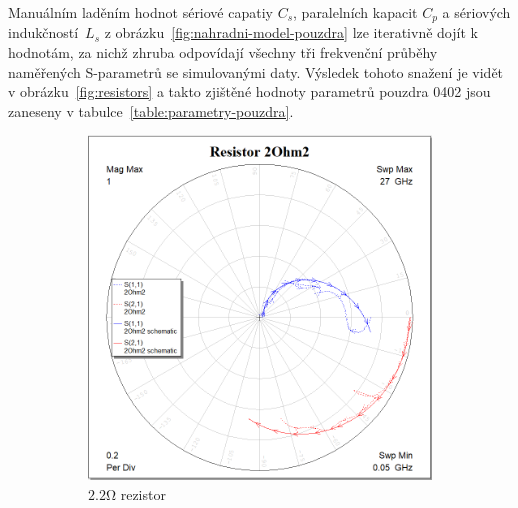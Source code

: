 \documentclass[11pt,a4paper]{article}
\newcommand{\Ohm}{\mathrm{\Omega}}
\begin{document}
Manuálním laděním hodnot sériové capatiy $C_s$, paralelních kapacit $C_p$ a sériových indukčností~$L_s$ z obrázku~\ref{fig:nahradni-model-pouzdra} lze iterativně dojít k hodnotám, za nichž zhruba odpovídají všechny tři frekvenční průběhy naměřených S-parametrů se simulovanými daty. Výsledek tohoto snažení je vidět v obrázku~\ref{fig:resistors} a takto zjištěné hodnoty parametrů pouzdra 0402 jsou zaneseny v tabulce~\ref{table:parametry-pouzdra}.
\begin{figure}[!ht]
    \centering
\begin{subfigure}{0.45\textwidth}
    \centering
    \includegraphics[width=\textwidth]{src/resistor-2Ohm2.png}
    \caption{\label{fig:resistor-2Ohm2}$2.2\Ohm$ rezistor}
\end{subfigure}
\begin{subfigure}{0.45\textwidth}
    \centering

\end{subfigure}
\end{figure}
\end{document}
